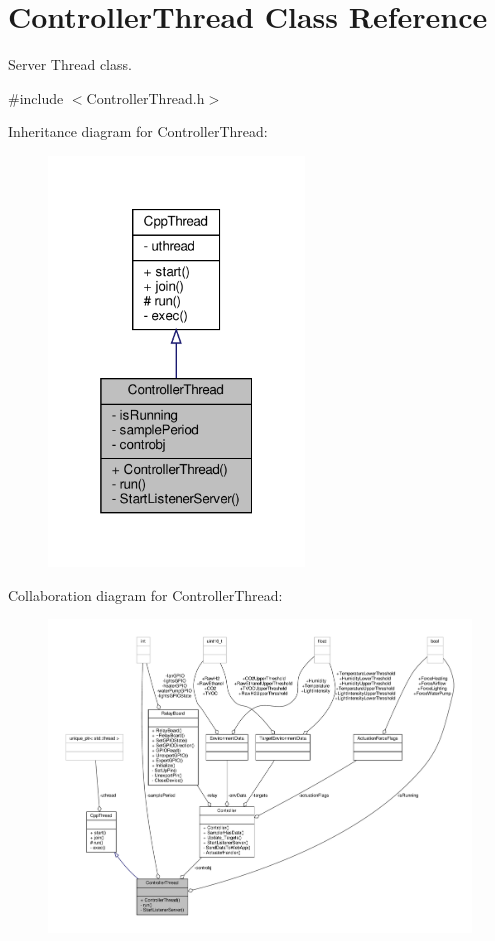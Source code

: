 \hypertarget{classControllerThread}{}\section{Controller\+Thread Class Reference}
\label{classControllerThread}


Server Thread class.  




{\ttfamily \#include $<$Controller\+Thread.\+h$>$}



Inheritance diagram for Controller\+Thread\+:\nopagebreak
\begin{figure}[H]
\begin{center}
\leavevmode
\includegraphics[width=193pt]{classControllerThread__inherit__graph}
\end{center}
\end{figure}


Collaboration diagram for Controller\+Thread\+:\nopagebreak
\begin{figure}[H]
\begin{center}
\leavevmode
\includegraphics[width=350pt]{classControllerThread__coll__graph}
\end{center}
\end{figure}
